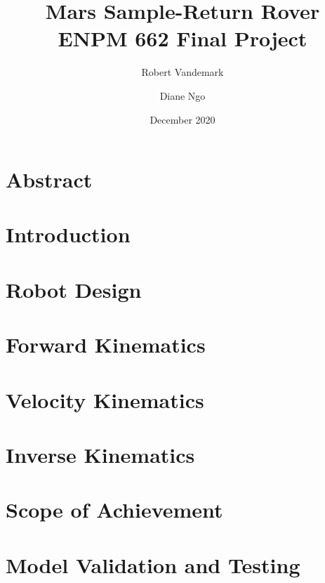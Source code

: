 \documentclass[a4paper, 12pt]{report}
\title{Mars Sample-Return Rover \\
\large ENPM 662 Final Project}
\date{December 2020}
\author{Robert Vandemark \and Diane Ngo}
\begin{document}
	
	\setcounter{page}{1}
	\maketitle
	
	\tableofcontents
	\newpage
	
	\chapter{Abstract}
	

	\chapter{Introduction}
	

	\chapter{Robot Design}
	

	\chapter{Forward Kinematics}
	

	\chapter{Velocity Kinematics}
	

	\chapter{Inverse Kinematics}
	

	\chapter{Scope of Achievement}
	

	\chapter{Model Validation and Testing}
	
	\begin{center}
		\printbibliography[heading=bibintoc, title={Bibliography}]
	\end{center}
\end{document}
